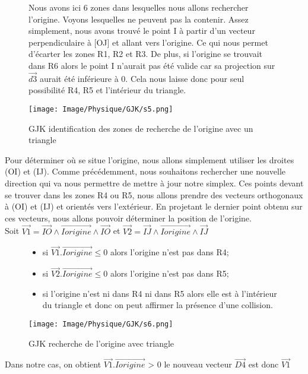 \begin{figure}[h!]
	\begin{minipage}{0.5\linewidth}
		Nous avons ici 6 zones dans lesquelles nous allons rechercher l'origine. Voyons lesquelles ne peuvent pas la contenir. Assez simplement, nous avons trouvé le point I à partir d'un vecteur perpendiculaire à [OJ] et allant vers l'origine. Ce qui nous permet d'écarter les zones R1, R2 et R3. De plus, si l'origine se trouvait dans R6 alors le point I n'aurait pas été valide car sa projection sur $\vec{d3}$ aurait été inférieure à 0. Cela nous laisse donc pour seul possibilité R4, R5 et l'intérieur du triangle.
	\end{minipage}
	\hfill
	\begin{minipage}{0.45\linewidth}
		\texttt{[image: Image/Physique/GJK/s5.png]}
		\caption{GJK identification des zones de recherche de l'origine avec un triangle}
		\label{fig:GJK identification des zones de recherche de l'origine avec un triangle}
	\end{minipage}	
\end{figure}

\noindent Pour déterminer où se situe l'origine, nous allons simplement utiliser les droites (OI) et (IJ). Comme précédemment, nous souhaitons rechercher une nouvelle direction qui va nous permettre de mettre à jour notre simplex. Ces points devant se trouver dans les zones R4 ou R5, nous allons prendre des vecteurs orthogonaux à (OI) et (IJ) et orientés vers l'extérieur. En projetant le dernier point obtenu sur ces vecteurs, nous allons pouvoir déterminer la position de l'origine. \\

\noindent Soit $\vec{V1} = \vec{IO} \land \vec{Iorigine} \land \vec{IO}$  et 
$\vec{V2} = \vec{IJ} \land \vec{Iorigine} \land \vec{IJ}$


\begin{figure}[h!]
	\begin{minipage}{0.55\linewidth}
		\begin{itemize}[label=-]
			\item si $\vec{V1}. \vec{Iorigine} \le 0$ alors l'origine n'est pas dans R4;
			\item si $\vec{V2}. \vec{Iorigine} \le 0$ alors l'origine n'est pas dans R5;
			\item si l'origine n'est ni dans R4 ni dans R5 alors elle est à l'intérieur du triangle et donc on peut affirmer la présence d'une collision.
		\end{itemize}
	
	\end{minipage}
	\hfill
	\begin{minipage}{0.45\linewidth}
		\texttt{[image: Image/Physique/GJK/s6.png]}
		\caption{GJK recherche de l'origine avec triangle}
		\label{fig:GJK recherche de l'origine avec triangle}
	\end{minipage}	
\end{figure}
\noindent Dans notre cas, on obtient $\vec{V1}. \vec{Iorigine}$ > 0 le nouveau vecteur $\vec{D4}$ est donc $\vec{V1}$

